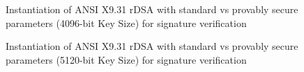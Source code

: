 \documentclass[]{final_report}
\theoremstyle{definition}
\begin{document}
\begin{figure}[H]
    \centering %
     \caption{Instantiation of ANSI X9.31 rDSA with standard vs provably secure parameters (4096-bit Key Size) for signature verification}
    \begin{minipage}{\textwidth}
        \centering
    \end{minipage}
         \label{ansi_verify_4096bit_table}
\end{figure}

\begin{figure}[H]
    \centering %
     \caption{Instantiation of ANSI X9.31 rDSA with standard vs provably secure parameters (5120-bit Key Size) for signature verification}
    \begin{minipage}{\textwidth}
        \centering
    \end{minipage}
       \label{ansi_verify_5120bit_table}
\end{figure}
\end{document}
